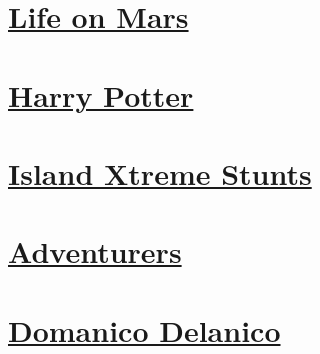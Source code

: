 \section*{\centering \hyperref[contents]{Life on Mars}}\label{image:Life on Mars}
\begin{figure}[H]\begin{flushleft}
\end{flushleft}\end{figure}
\vspace{2.5cm}
\section*{\centering \hyperref[contents]{Harry Potter}}\label{image:Harry Potter}
\begin{figure}[H]\begin{flushleft}
\end{flushleft}\end{figure}
\vspace{2.5cm}
\section*{\centering \hyperref[contents]{Island Xtreme Stunts}}\label{image:Island Xtreme Stunts}
\begin{figure}[H]\begin{flushleft}
\end{flushleft}\end{figure}
\vspace{2.5cm}
\section*{\centering \hyperref[contents]{Adventurers}}\label{image:Adventurers}
\begin{figure}[H]\begin{flushleft}
\end{flushleft}\end{figure}
\vspace{2.5cm}
\section*{\centering \hyperref[contents]{Domanico Delanico}}\label{image:Domanico Delanico}
\begin{figure}[H]\begin{flushleft}
\end{flushleft}\end{figure}
\newpage
